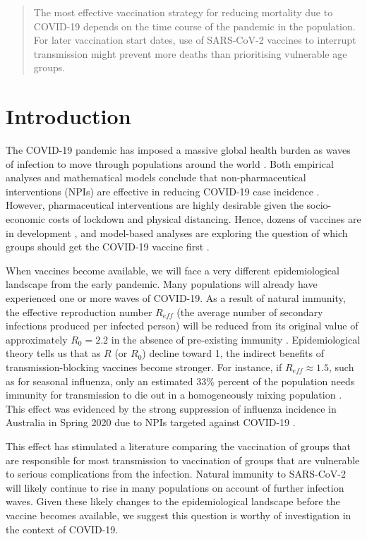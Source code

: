 \begin{abstract}
The most effective vaccination strategy for reducing mortality due to COVID-19 depends on the time course of the pandemic in the population. For later vaccination start dates, use of SARS-CoV-2 vaccines to interrupt transmission might prevent more deaths than prioritising vulnerable age groups.

\end{abstract}


\section{Introduction}


The COVID-19 pandemic has imposed a massive global health burden as waves of infection to move through populations around the world \cite{miller2020disease}.  Both empirical analyses and mathematical models conclude that non-pharmaceutical interventions (NPIs) are effective in reducing COVID-19 case incidence \cite{anderson2020estimating,peak2020individual,tuite2020mathematical}.  However, pharmaceutical interventions are highly desirable given the socio-economic costs of lockdown and physical distancing.  Hence, dozens of vaccines are  in development \cite{lurie2020developing}, and  model-based analyses are exploring the question of which groups should get the COVID-19 vaccine first \cite{bubar2020model,hoyt2020vaccine}.  


When vaccines become available, we will face a very different epidemiological landscape from the early pandemic. Many populations will already have experienced one or more waves of COVID-19.  As a result of natural immunity, the effective reproduction number $R_{eff}$ (the average number of secondary infections produced per infected person) will be reduced from its original value of approximately $R_0 = 2.2$ in the absence of pre-existing immunity \cite{hilton2020estimation}. Epidemiological theory tells us that as $R$ (or $R_0$) decline toward 1, the indirect benefits of transmission-blocking vaccines become stronger.  For instance, if $R_{eff} \approx 1.5$, such as for seasonal influenza, only an estimated $33 \%$ percent of the population needs immunity for transmission to die out in a homogeneously mixing population  \cite{anderson1992infectious,dushoff2007vaccinating}.  This effect was evidenced by the strong suppression of influenza incidence in Australia in Spring 2020 due to NPIs targeted against COVID-19 \cite{aussie2020}. 

This effect has stimulated a literature comparing the vaccination of groups that are responsible for most transmission to vaccination of groups that are vulnerable to serious complications from the infection. Natural immunity to SARS-CoV-2 will likely continue to rise in many populations on account of further infection waves. Given these likely changes to the epidemiological landscape before the vaccine becomes available, we suggest this question is worthy of investigation in the context of COVID-19. 


